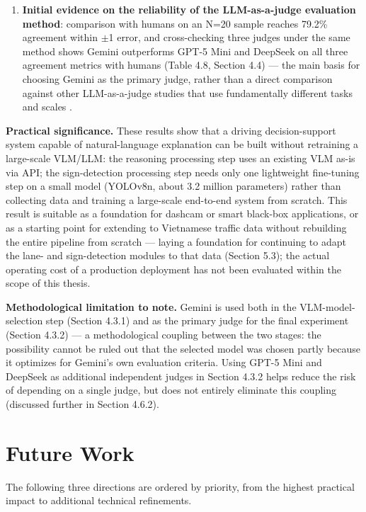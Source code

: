 \documentclass[12pt,a4paper]{report}
\begin{document}
\begin{enumerate}
    \item \textbf{Initial evidence on the reliability of the LLM-as-a-judge evaluation method}: comparison with humans on an N=20 sample reaches 79.2\% agreement within $\pm$1 error, and cross-checking three judges under the same method shows Gemini outperforms GPT-5 Mini and DeepSeek on all three agreement metrics with humans (Table 4.8, Section 4.4) --- the main basis for choosing Gemini as the primary judge, rather than a direct comparison against other LLM-as-a-judge studies that use fundamentally different tasks and scales \cite{zheng2023mtbench}.
\end{enumerate}

\textbf{Practical significance.} These results show that a driving decision-support system capable of natural-language explanation can be built without retraining a large-scale VLM/LLM: the reasoning processing step uses an existing VLM as-is via API; the sign-detection processing step needs only one lightweight fine-tuning step on a small model (YOLOv8n, about 3.2 million parameters) rather than collecting data and training a large-scale end-to-end system from scratch. This result is suitable as a foundation for dashcam or smart black-box applications, or as a starting point for extending to Vietnamese traffic data without rebuilding the entire pipeline from scratch --- laying a foundation for continuing to adapt the lane- and sign-detection modules to that data (Section 5.3); the actual operating cost of a production deployment has not been evaluated within the scope of this thesis.

\textbf{Methodological limitation to note.} Gemini is used both in the VLM-model-selection step (Section 4.3.1) and as the primary judge for the final experiment (Section 4.3.2) --- a methodological coupling between the two stages: the possibility cannot be ruled out that the selected model was chosen partly because it optimizes for Gemini's own evaluation criteria. Using GPT-5 Mini and DeepSeek as additional independent judges in Section 4.3.2 helps reduce the risk of depending on a single judge, but does not entirely eliminate this coupling (discussed further in Section 4.6.2).

\section{Future Work}

The following three directions are ordered by priority, from the highest practical impact to additional technical refinements.
\end{document}
